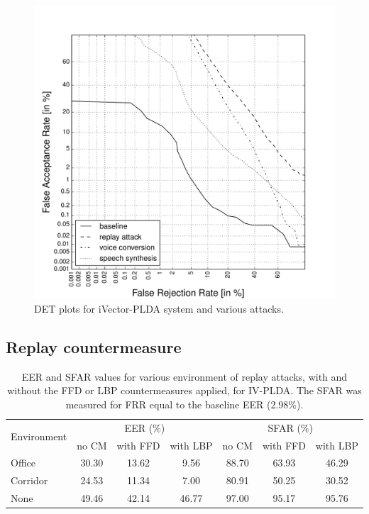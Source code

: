 \begin{figure}[!t]
	\centering
	\includegraphics[width=1\linewidth]{Figs/DETs_IV_ss_vc_rp.pdf}
	\caption{DET plots for iVector-PLDA system and various attacks.}
	\label{fig::DETs_4attacks}
\end{figure}




\subsection{Replay countermeasure}


\begin{table}
\renewcommand{\arraystretch}{1.2}
\begin{center}
    \begin{tabular}{ l || c c c | c c c}
    \hline
 \multirow{2}{*}{Environment}  & \multicolumn{3}{c|}{EER (\%)} & \multicolumn{3}{c}{SFAR (\%)} \\
     	 & no CM & with FFD & with LBP & no CM & with FFD & with LBP\\ 

 \hline \hline
Office   & 30.30 & 13.62 & 9.56 & 88.70 & 63.93 & 46.29\\
Corridor & 24.53 & 11.34 & 7.00 & 80.91 & 50.25 & 30.52\\
None & 49.46 & 42.14 & 46.77 & 97.00 & 95.17 & 95.76\\
\hline
    \end{tabular}
    \caption{EER and SFAR values for various environment of replay attacks, with and without the FFD or LBP countermeasures applied, for IV-PLDA. The SFAR was measured for FRR equal to the baseline EER (2.98\%).}
		\label{tab::results_CM_rooms}
   \end{center}
\end{table}




